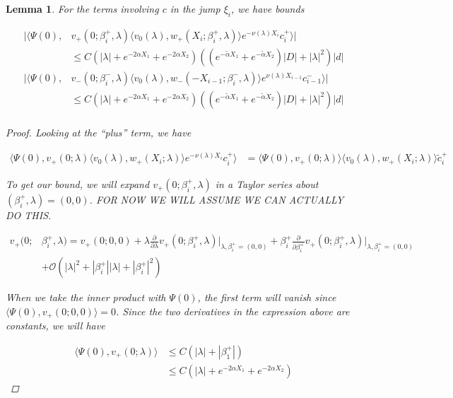 \documentclass[12pt]{article}
\newtheorem{lemma}{Lemma}
\begin{document}
\begin{lemma}\label{jumpc}
For the terms involving $c$ in the jump $\xi_i$, we have bounds

\begin{align*}
|\langle \Psi(0), &v_+(0; \beta_i^+, \lambda) \langle v_0(\lambda), w_+(X_i; \beta_i^+,\lambda) \rangle e^{-\nu(\lambda)X_i} c_i^+ \rangle| \\
&\leq C ( |\lambda| + e^{-2 \alpha X_1} + e^{-2 \alpha X_2} )
( ( e^{-\tilde{\alpha} X_1} + e^{-\tilde{\alpha} X_2}) |D| + |\lambda|^2 )|d| \\
|\langle \Psi(0), &v_-(0; \beta_i^-, \lambda) \langle v_0(\lambda), w_-(-X_{i-1}; \beta_i^-, \lambda) \rangle e^{\nu(\lambda)X_{i-1}} c_{i-1}^- \rangle | \\
&\leq C ( |\lambda| + e^{-2 \alpha X_1} + e^{-2 \alpha X_2} )
( ( e^{-\tilde{\alpha} X_1} + e^{-\tilde{\alpha} X_2}) |D| + |\lambda|^2 )|d|  \\
\end{align*}

\begin{proof}
Looking at the ``plus'' term, we have

\begin{align*}
\langle \Psi(0), v_+(0; \lambda) \langle v_0(\lambda), w_+(X_i; \lambda) \rangle e^{-\nu(\lambda)X_i} c_i^+ \rangle &= \langle \Psi(0), v_+(0; \lambda) \rangle \langle v_0(\lambda), w_+(X_i; \lambda) \rangle \tilde{c}_i^+
\end{align*}

To get our bound, we will expand $v_+(0; \beta_i^+, \lambda)$ in a Taylor series about $(\beta_i^+, \lambda) = (0, 0)$. FOR NOW WE WILL ASSUME WE CAN ACTUALLY DO THIS.

\begin{align*}
v_+(0; &\beta_i^+, \lambda) = v_+(0; 0, 0) 
+ \lambda \frac{\partial}{\partial \lambda}v_+(0; \beta_i^+, \lambda)\Big|_{\lambda, \beta_i^+ = (0, 0)} 
+ \beta_i^+ \frac{\partial}{\partial \beta_i^+}v_+(0; \beta_i^+, \lambda)\Big|_{\lambda, \beta_i^+ = (0, 0)} \\
&+ \mathcal{O}(|\lambda|^2 + |\beta_i^+||\lambda| + |\beta_i^+|^2)
\end{align*}

When we take the inner product with $\Psi(0)$, the first term will vanish since 
$\langle \Psi(0), v_+(0; 0, 0) \rangle = 0$. Since the two derivatives in the expression above are constants, we will have

\begin{align*}
\langle \Psi(0), v_+(0; \lambda) \rangle &\leq C ( |\lambda| + |\beta_1^+| ) \\
&\leq C ( |\lambda| + e^{-2 \alpha X_1} + e^{-2 \alpha X_2} )
\end{align*}


\end{proof}
\end{lemma}
\end{document}
